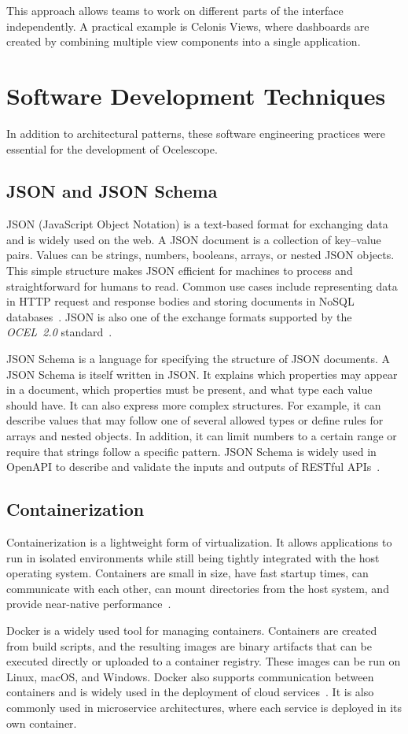 This approach allows teams to work on different parts of the interface independently. A practical example is Celonis Views, where dashboards are created by combining multiple view components into a single application.

\section{Software Development Techniques}

In addition to architectural patterns, these software engineering practices were essential for the development of Ocelescope.

\subsection{JSON and JSON Schema}

JSON (JavaScript Object Notation) is a text-based format for exchanging data and is widely used on the web. A JSON document is a collection of key--value pairs. Values can be strings, numbers, booleans, arrays, or nested JSON objects.
This simple structure makes JSON efficient for machines to process and straightforward for humans to read.
Common use cases include representing data in HTTP request and response bodies and storing documents in NoSQL databases~\cite{json}.
JSON is also one of the exchange formats supported by the \textit{OCEL~2.0} standard~\cite{ocel2}.


JSON Schema is a language for specifying the structure of JSON documents. A JSON Schema is itself written in JSON. It explains which properties may appear in a document, which properties must be present, and what type each value should have. It can also express more complex structures. For example, it can describe values that may follow one of several allowed types or define rules for arrays and nested objects. In addition, it can limit numbers to a certain range or require that strings follow a specific pattern. JSON Schema is widely used in OpenAPI to describe and validate the inputs and outputs of RESTful APIs~\cite{json}.

\subsection{Containerization}

Containerization is a lightweight form of virtualization. It allows applications to run in isolated environments while still being tightly integrated with the host operating system. Containers are small in size, have fast startup times, can communicate with each other, can mount directories from the host system, and provide near-native performance~\cite{docker}.

Docker is a widely used tool for managing containers. Containers are created from build scripts, and the resulting images are binary artifacts that can be executed directly or uploaded to a container registry. These images can be run on Linux, macOS, and Windows. Docker also supports communication between containers and is widely used in the deployment of cloud services~\cite{dockerinscience}. It is also commonly used in microservice architectures, where each service is deployed in its own container.
